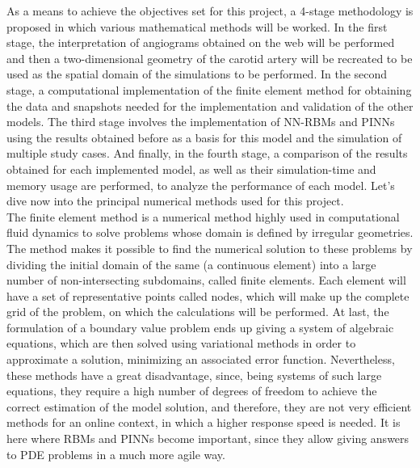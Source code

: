 \documentclass[12pt,letterpaper]{article}
\begin{document}

As a means to achieve the objectives set for this project, a 4-stage methodology is proposed in which various mathematical methods will be worked. In the first stage, the interpretation of angiograms obtained on the web will be performed and then a two-dimensional geometry of the carotid artery will be recreated to be used as the spatial domain of the simulations to be performed. In the second stage, a computational implementation of the finite element method for obtaining the data and snapshots needed for the implementation and validation of the other models. The third stage involves the implementation of NN-RBMs and PINNs using the results obtained before as a basis for this model and the simulation of multiple study cases. And finally, in the fourth stage, a comparison of the results obtained for each implemented model, as well as their simulation-time and memory usage are performed, to analyze the performance of each model. Let's dive now into the principal numerical methods used for this project.\\

The finite element method is a numerical method highly used in computational fluid dynamics to solve problems whose domain is defined by irregular geometries. The method makes it possible to find the numerical solution to these problems by dividing the initial domain of the same (a continuous element) into a large number of non-intersecting subdomains, called finite elements. Each element will have a set of representative points called nodes, which will make up the complete grid of the problem, on which the calculations will be performed. At last, the formulation of a boundary value problem ends up giving a system of algebraic equations, which are then solved using variational methods in order to approximate a solution, minimizing an associated error function\cite{element}. Nevertheless, these methods have a great disadvantage, since, being systems of such large equations, they require a high number of degrees of freedom to achieve the correct estimation of the model solution, and therefore, they are not very efficient methods for an online context, in which a higher response speed is needed. It is here where RBMs and PINNs become important, since they allow giving answers to PDE problems in a much more agile way.\\
\end{document}

